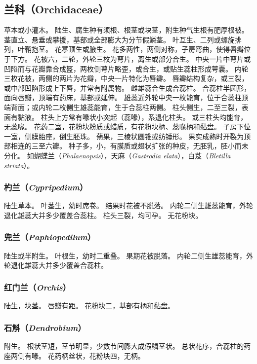 \documentclass[11pt]{article}
\begin{document}
\begin{sloppypar}
\subsection{兰科（Orchidaceae）}
草本或小灌木。
陆生、腐生种有须根、根茎或块茎，附生种气生根有肥厚根被。
茎直立、悬垂或攀援，基部或全部膨大为分节假鳞茎。
叶互生、二列或螺旋排列，叶鞘抱茎。
花葶顶生或腋生。
花多两性，两侧对称，子房弯曲，使得唇瓣位于下方。
花被六，二轮，外轮三枚为萼片，离生或部分合生。
中央一片中萼片或凹陷而与花瓣靠合成盔，两枚侧萼片略歪，或合生，或贴生蕊柱形成萼囊。
内轮三枚花被，两侧的两片为花瓣，中央一片特化为唇瓣。
唇瓣结构复杂，或三裂，或中部凹陷形成上下唇，并常有附属物。
雌雄蕊合生成合蕊柱。
合蕊柱半圆形，面向唇瓣，顶端有药床，基部或延伸。
雄蕊近外轮中央一枚能育，位于合蕊柱顶端背面；或内轮二枚侧生雄蕊能育，生于合蕊柱两侧。
柱头侧生，二至三裂，表面有黏液。
柱头上方常有喙状小突起（蕊喙），系退化柱头。
或三柱头均能育，无蕊喙。
花药二室，花粉块粉质或蜡质，有花粉块柄、蕊喙柄和黏盘。
子房下位一室，侧膜胎座，倒生胚珠。
蒴果，三棱状圆锥或纺锤形。
果实成熟时开裂为顶部相连的三至六瓣。
种子多，小，有膜质或翅状扩张的种皮，无胚乳，胚小而未分化。
如蝴蝶兰（\textit{Phalaenopsis}），天麻（\textit{Gastrodia elata}），白芨（\textit{Bletilla striata}）。

\subsubsection{杓兰（\textit{Cypripedium}）}
陆生草本。
叶茎生，幼时席卷。
结果时花被不脱落。
内轮二侧生雄蕊能育，外轮退化雄蕊大并多少覆盖合蕊柱。
柱头三裂，均可孕。
无花粉块。

\subsubsection{兜兰（\textit{Paphiopedilum}）}
陆生或半附生。
叶根生，幼时二重叠。
果期花被脱落。
内轮二侧生雄蕊能育，外轮退化雄蕊大并多少覆盖合蕊柱。

\subsubsection{红门兰（\textit{Orchis}）}
陆生，块茎。
唇瓣有距。
花粉块二，基部有柄和黏盘。

\subsubsection{石斛（\textit{Dendrobium}）}
附生。
根状茎短，茎节明显，少数节间膨大成假鳞茎状。
总状花序，合蕊柱的药座两侧有喙。
花药柄丝状，花粉块四，无柄。


\end{sloppypar}
\end{document}
